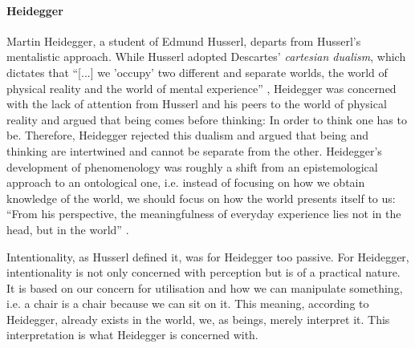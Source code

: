 \paragraph{Heidegger} Martin Heidegger, a student of Edmund Husserl, departs from Husserl's mentalistic approach. While Husserl adopted Descartes' \textit{cartesian dualism}, which dictates that ``[...] we 'occupy' two different and separate worlds, the world of physical reality and the world of mental experience'' \cite[p. 107]{dourish}, Heidegger was concerned with the lack of attention from Husserl and his peers to the world of physical reality and argued that being comes before thinking: In order to think one has to be. Therefore, Heidegger rejected this dualism and argued that being and thinking are intertwined and cannot be separate from the other. Heidegger's development of phenomenology was roughly a shift from an epistemological approach to an ontological one, i.e. instead of focusing on how we obtain knowledge of the world, we should focus on how the world presents itself to us: ``From his perspective, the meaningfulness of everyday experience lies not in the head, but in the world'' \cite[p. 107]{dourish}.

Intentionality, as Husserl defined it, was for Heidegger too passive. For Heidegger, intentionality is not only concerned with perception but is of a practical nature. It is based on our concern for utilisation and how we can manipulate something, i.e. a chair is a chair because we can sit on it. This meaning, according to Heidegger, already exists in the world, we, as beings, merely interpret it. This interpretation is what Heidegger is concerned with.

